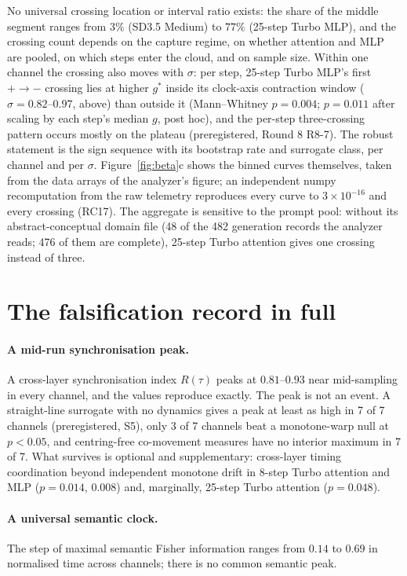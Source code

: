 No universal crossing location or interval ratio exists: the share of the middle segment ranges from $3\%$ (SD3.5 Medium) to $77\%$ (25-step Turbo MLP), and the crossing count depends on the capture regime, on whether attention and MLP are pooled, on which steps enter the cloud, and on sample size. Within one channel the crossing also moves with $\sigma$: per step, 25-step Turbo MLP's first $+\to-$ crossing lies at higher $g^*$ inside its clock-axis contraction window ($\sigma=0.82$--$0.97$, above) than outside it (Mann--Whitney $p=0.004$; $p=0.011$ after scaling by each step's median $g$, post hoc), and the per-step three-crossing pattern occurs mostly on the plateau (preregistered, Round 8 R8-7). The robust statement is the sign sequence with its bootstrap rate and surrogate class, per channel and per $\sigma$. Figure~\ref{fig:beta}c shows the binned curves themselves, taken from the data arrays of the analyzer's figure; an independent numpy recomputation from the raw telemetry reproduces every curve to $3\times10^{-16}$ and every crossing (RC17). The aggregate is sensitive to the prompt pool: without its abstract-conceptual domain file (48 of the 482 generation records the analyzer reads; 476 of them are complete), 25-step Turbo attention gives one crossing instead of three.

\section{The falsification record in full}\label{supp:fals}
\paragraph{A mid-run synchronisation peak.} A cross-layer synchronisation index $R(\tau)$ peaks at $0.81$--$0.93$ near mid-sampling in every channel, and the values reproduce exactly. The peak is not an event. A straight-line surrogate with no dynamics gives a peak at least as high in 7 of 7 channels (preregistered, S5), only 3 of 7 channels beat a monotone-warp null at $p<0.05$, and centring-free co-movement measures have no interior maximum in 7 of 7. What survives is optional and supplementary: cross-layer timing coordination beyond independent monotone drift in 8-step Turbo attention and MLP ($p=0.014$, $0.008$) and, marginally, 25-step Turbo attention ($p=0.048$).

\paragraph{A universal semantic clock.} The step of maximal semantic Fisher information ranges from $0.14$ to $0.69$ in normalised time across channels; there is no common semantic peak.

